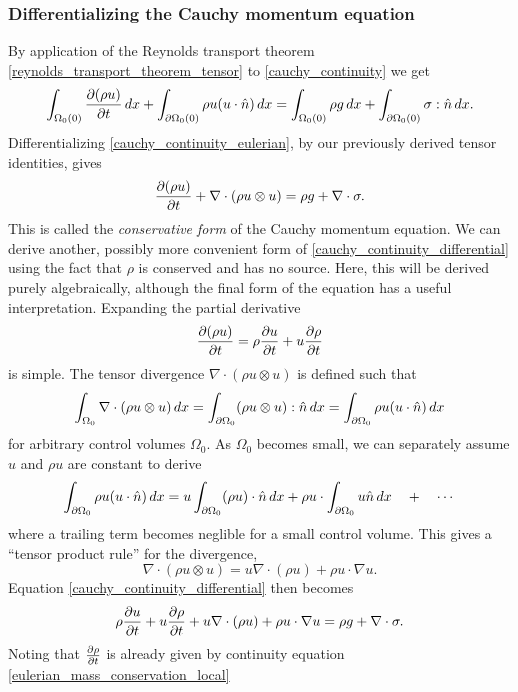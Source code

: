 \subsubsection{Differentializing the Cauchy momentum equation}
By application of the Reynolds transport theorem \eqref{reynolds_transport_theorem_tensor} to \eqref{cauchy_continuity} we get
\begin{equation}\label{cauchy_continuity_eulerian}
    \int_{\Omega_0(0)}\frac{\partial (\rho u)}{\partial t}\,dx + \int_{\partial\Omega_0(0)}\rho u (u\cdot \hat{n})\,dx = \int_{\Omega_0(0)} \rho g\,dx + \int_{{\partial\Omega_0}(0)} \sigma:\hat{n}\,dx.
\end{equation}
Differentializing \eqref{cauchy_continuity_eulerian}, by our previously derived tensor identities, gives
\begin{equation}\label{cauchy_continuity_differential}
    \frac{\partial (\rho u)}{\partial t} + \nabla \cdot (\rho u\otimes u) = \rho g + \nabla\cdot\sigma.
\end{equation}
This is called the \textit{conservative form} of the Cauchy momentum equation.
We can derive another, possibly more convenient form of \eqref{cauchy_continuity_differential} using the fact that
$\rho$ is conserved and has no source. Here, this will be derived purely algebraically, although the final form of the equation
has a useful interpretation. Expanding the partial derivative
$$
    \frac{\partial (\rho u)}{\partial t} = \rho\frac{\partial u}{\partial t} + u\frac{\partial \rho}{\partial t}
$$
is simple. The tensor divergence $\nabla \cdot (\rho u\otimes u)$ is defined such that
$$
    \int_{\Omega_0} \nabla \cdot (\rho u\otimes u)\,dx = \int_{{\partial\Omega_0}} (\rho u\otimes u) : \hat{n}\,dx = \int_{{\partial\Omega_0}} \rho u (u\cdot\hat{n})\,dx
$$
for arbitrary control volumes $\Omega_0$. As $\Omega_0$ becomes small, we can separately assume $u$ and $\rho u$ are constant
to derive
$$
    \int_{{\partial\Omega_0}} \rho u (u\cdot\hat{n})\,dx = u\int_{{\partial\Omega_0}}(\rho u)\cdot\hat{n}\,dx
                                              + \rho u\cdot \int_{{\partial\Omega_0}} u\hat{n}\,dx \quad+\quad\cdots
$$
where a trailing term becomes neglible for a small control volume. This gives a ``tensor product rule'' for the divergence,
\begin{equation}\label{cauchy_divergence_tensor_product}
    \nabla\cdot (\rho u \otimes u) = u\nabla\cdot (\rho u) + \rho u\cdot\nabla u.
\end{equation}
Equation \eqref{cauchy_continuity_differential} then becomes
$$
    \rho\frac{\partial u}{\partial t} + u\frac{\partial \rho}{\partial t} + u\nabla\cdot (\rho u) + \rho u\cdot\nabla u = \rho g + \nabla\cdot\sigma.
$$
Noting that $\frac{\partial \rho}{\partial t}$ is already given by continuity equation \eqref{eulerian_mass_conservation_local}
